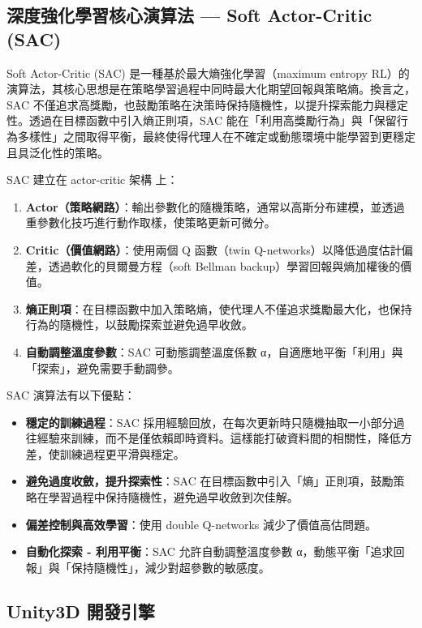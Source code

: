 \documentclass[12pt,a4paper]{article}
\begin{document}
\subsection{深度強化學習核心演算法 — Soft Actor-Critic (SAC)}
Soft Actor-Critic (SAC) 是一種基於最大熵強化學習（maximum entropy RL）的演算法，其核心思想是在策略學習過程中同時最大化期望回報與策略熵。換言之，SAC 不僅追求高獎勵，也鼓勵策略在決策時保持隨機性，以提升探索能力與穩定性。透過在目標函數中引入熵正則項，SAC 能在「利用高獎勵行為」與「保留行為多樣性」之間取得平衡，最終使得代理人在不確定或動態環境中能學習到更穩定且具泛化性的策略。
\\ \par
SAC 建立在 actor-critic 架構 上：
\begin{enumerate}
	\item \textbf{Actor（策略網路）}：輸出參數化的隨機策略，通常以高斯分布建模，並透過重參數化技巧進行動作取樣，使策略更新可微分。
	\item \textbf{Critic（價值網路）}：使用兩個 Q 函數（twin Q-networks）以降低過度估計偏差，透過軟化的貝爾曼方程（soft Bellman backup）學習回報與熵加權後的價值。
	\item \textbf{熵正則項}：在目標函數中加入策略熵，使代理人不僅追求獎勵最大化，也保持行為的隨機性，以鼓勵探索並避免過早收斂。
	\item \textbf{自動調整溫度參數}：SAC 可動態調整溫度係數 α，自適應地平衡「利用」與「探索」，避免需要手動調參。
\end{enumerate}

SAC 演算法有以下優點：
\begin{itemize}
	\item \textbf{穩定的訓練過程}：SAC 採用經驗回放，在每次更新時只隨機抽取一小部分過往經驗來訓練，而不是僅依賴即時資料。這樣能打破資料間的相關性，降低方差，使訓練過程更平滑與穩定。
	\item \textbf{避免過度收斂，提升探索性}：SAC 在目標函數中引入「熵」正則項，鼓勵策略在學習過程中保持隨機性，避免過早收斂到次佳解。
	\item \textbf{偏差控制與高效學習}：使用 double Q-networks 減少了價值高估問題。
	\item \textbf{自動化探索 - 利用平衡}：SAC 允許自動調整溫度參數 α，動態平衡「追求回報」與「保持隨機性」，減少對超參數的敏感度。
\end{itemize}

\subsection{Unity3D 開發引擎}
\end{document}

